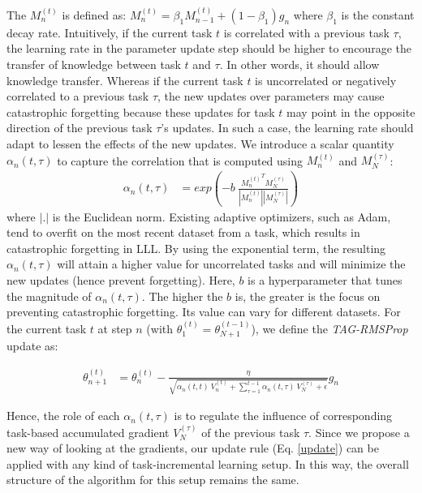 \documentclass{article} \usepackage{collas2022_conference,times}
\begin{document}
    The $M^{(t)}_n$ is defined as: 
$M^{(t)}_n = \beta_1 M^{(t)}_{n-1} + (1-\beta_1)g_n$ 
where $\beta_1$ is the constant decay rate. Intuitively, if the current task $t$ is correlated with a previous task $\tau$, the learning rate in the parameter update step should be higher to encourage the transfer of knowledge between task $t$ and $\tau$. In other words, it should allow knowledge transfer. Whereas if the current task $t$ is uncorrelated or negatively correlated to a previous task $\tau$, the new updates over parameters may cause catastrophic forgetting because these updates for task $t$ may point in the opposite direction of the previous task $\tau$'s updates. In such a case, the learning rate should adapt to lessen the effects of the new updates. We introduce a scalar quantity $\alpha_n(t,\tau)$ to capture the correlation that is computed using $M^{(t)}_n$ and $M^{(\tau)}_N$: 
    \begin{align} \label{alpha_eq}
    \alpha_n(t,\tau) &=  exp\left(-b~\frac{{M_n^{(t)}}^TM^{(\tau)}_N}{|M_n^{(t)}||M^{(\tau)}_N|}\right)
    \end{align}
    where $|.|$ is the Euclidean norm. Existing adaptive optimizers, such as Adam, tend to overfit on the most recent dataset from a task, which results in catastrophic forgetting in LLL. By using the exponential term, the resulting $\alpha_n(t,\tau)$ will attain a higher value for uncorrelated tasks and will minimize the new updates (hence prevent forgetting). 
    Here, $b$ is a hyperparameter that tunes the magnitude of $\alpha_n(t,\tau)$. The higher the $b$ is, the greater is the focus on preventing catastrophic forgetting. Its value can vary for different datasets. For the current task $t$ at step $n$ (with $\theta^{(t)}_1 = \theta^{(t-1)}_{N+1}$), we define the \textit{TAG-RMSProp} update as:

    \begin{align} \label{update}
    \theta^{(t)}_{n+1} &= \theta^{(t)}_n - \frac{\eta}{\sqrt{\alpha_n(t,t)~ V^{(t)}_n + \sum\limits_{\tau=1}^{t-1} \alpha_n(t,\tau)~ V^{(\tau)}_N + \epsilon}} g_n
    \end{align}





    Hence, the role of each $\alpha_n(t,\tau)$ is to regulate the influence of corresponding task-based accumulated gradient $V^{(\tau)}_N$ of the previous task $\tau$. Since we propose a new way of looking at the gradients, our update rule (Eq. \ref{update}) can be applied with any kind of task-incremental learning setup. In this way, the overall structure of the algorithm for this setup remains the same.
\end{document}
